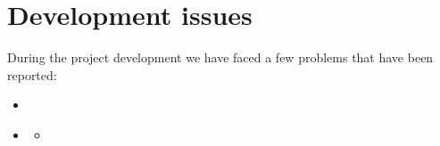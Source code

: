 \documentclass[11pt,a4paper]{article}
\begin{document}
\section{Development issues}

During the project development we have faced a few problems that have been reported:
\begin{itemize}
    \item \href{https://github.com/IBM-Bluemix-Docs/ContinuousDelivery/issues/13}{}
    \item \href{https://github.com/IBM-Cloud/aspnet-core-helloworld/issues/39}{\color{urlColor}{github.com/IBM-Cloud/aspnet-core-helloworld/issues/39}}
    \begin{itemize}
        \item \href{https://github.com/IBM-Cloud/aspnet-core-helloworld/pull/40}{}
    \end{itemize}
\end{itemize}
\end{document}
